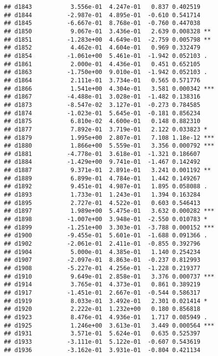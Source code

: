 \documentclass[
]{article}
\begin{document}
\begin{verbatim}
## d1843           3.556e-01  4.247e-01   0.837 0.402519    
## d1844          -2.987e-01  4.895e-01  -0.610 0.541714    
## d1845          -6.667e-01  8.768e-01  -0.760 0.447038    
## d1850           9.067e-01  3.436e-01   2.639 0.008328 ** 
## d1851          -1.283e+00  4.649e-01  -2.759 0.005798 ** 
## d1852           4.462e-01  4.604e-01   0.969 0.332479    
## d1854          -1.061e+00  5.461e-01  -1.942 0.052103 .  
## d1861           2.000e-01  4.436e-01   0.451 0.652105    
## d1863          -1.750e+00  9.010e-01  -1.942 0.052103 .  
## d1864           2.111e-01  3.734e-01   0.565 0.571776    
## d1866           1.541e+00  4.304e-01   3.581 0.000342 ***
## d1867          -4.488e-01  3.028e-01  -1.482 0.138316    
## d1873          -8.547e-02  3.127e-01  -0.273 0.784585    
## d1874          -1.023e-01  5.645e-01  -0.181 0.856234    
## d1875           6.810e-02  4.600e-01   0.148 0.882310    
## d1877           7.892e-01  3.719e-01   2.122 0.033823 *  
## d1879           1.995e+00  2.807e-01   7.108 1.18e-12 ***
## d1880           1.866e+00  5.559e-01   3.356 0.000792 ***
## d1881          -4.778e-01  3.618e-01  -1.321 0.186607    
## d1884          -1.429e+00  9.741e-01  -1.467 0.142492    
## d1887           9.371e-01  2.891e-01   3.241 0.001192 ** 
## d1889           6.899e-01  4.784e-01   1.442 0.149267    
## d1892           9.451e-01  4.987e-01   1.895 0.058088 .  
## d1893           1.733e-01  1.243e-01   1.394 0.163284    
## d1895           2.727e-01  4.522e-01   0.603 0.546413    
## d1897           1.989e+00  5.475e-01   3.632 0.000282 ***
## d1898          -1.007e+00  3.948e-01  -2.550 0.010783 *  
## d1899          -1.251e+00  3.303e-01  -3.788 0.000152 ***
## d1900          -9.455e-01  5.601e-01  -1.688 0.091366 .  
## d1902          -2.061e-01  2.411e-01  -0.855 0.392796    
## d1904           5.000e-01  4.385e-01   1.140 0.254234    
## d1907          -2.097e-01  8.863e-01  -0.237 0.812993    
## d1908          -5.227e-01  4.256e-01  -1.228 0.219377    
## d1910           9.649e-01  2.858e-01   3.376 0.000737 ***
## d1914           3.765e-01  4.373e-01   0.861 0.389219    
## d1917          -1.451e-01  2.667e-01  -0.544 0.586317    
## d1919           8.033e-01  3.492e-01   2.301 0.021414 *  
## d1920           2.222e-01  1.232e+00   0.180 0.856818    
## d1923           8.476e-01  4.936e-01   1.717 0.085949 .  
## d1925           1.246e+00  3.613e-01   3.449 0.000564 ***
## d1931           3.571e-01  5.624e-01   0.635 0.525397    
## d1933          -3.111e-01  5.122e-01  -0.607 0.543619    
## d1936          -3.162e-01  3.931e-01  -0.804 0.421134    

\end{verbatim}
\end{document}
